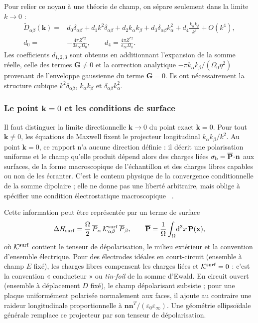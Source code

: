 Pour relier ce noyau à une théorie de champ, on sépare seulement dans la limite
$k\to0$ :
\begin{equation}
\begin{aligned}
\widetilde D_{\alpha\beta}(\mathbf k)
={}&d_0\delta_{\alpha\beta}
+d_1k^2\delta_{\alpha\beta}
+d_2k_\alpha k_\beta
+d_3\delta_{\alpha\beta}k_\alpha^2
+d_4\frac{k_\alpha k_\beta}{k^2}+O(k^4),\\
d_0={}&-\frac{4\pi Z^{*2}}{3\varepsilon_\infty\Omega_0},
\qquad
d_4=\frac{4\pi Z^{*2}}{\varepsilon_\infty\Omega_0}.
\end{aligned}
\label{eq:core_dipole_small_k}
\end{equation}
Les coefficients $d_{1,2,3}$ sont obtenus en additionnant l'expansion de la
somme réelle, celle des termes $\mathbf G\ne0$ et la correction analytique
$-\pi k_\alpha k_\beta/(\Omega_0\eta^2)$ provenant de l'enveloppe gaussienne
du terme $\mathbf G=0$. Ils ont nécessairement la structure cubique
$k^2\delta_{\alpha\beta}$, $k_\alpha k_\beta$ et
$\delta_{\alpha\beta}k_\alpha^2$.

\subsubsection{Le point \texorpdfstring{$\mathbf k=0$}{k=0} et les conditions de surface}

Il faut distinguer la limite directionnelle $\mathbf k\to0$ du point exact
$\mathbf k=0$. Pour tout $\mathbf k\neq0$, les équations de Maxwell fixent le
projecteur longitudinal $k_\alpha k_\beta/k^2$. Au point $\mathbf k=0$, ce
rapport n'a aucune direction définie : il décrit une polarisation uniforme et
le champ qu'elle produit dépend alors des charges liées
$\sigma_{\rm b}=\overline{\mathbf P}\!\cdot\!\mathbf n$ aux surfaces, de la
forme macroscopique de l'échantillon et des charges libres capables ou non de
les écranter. C'est le contenu physique de la convergence conditionnelle de la
somme dipolaire ; elle ne donne pas une liberté arbitraire, mais oblige à
spécifier une condition électrostatique macroscopique
~\cite{campbell1963existence,BornHuang1954}.

Cette information peut être représentée par un terme de surface
\begin{equation}
\Delta H_{\rm surf}
=\frac{\Omega}{2}\,
\overline P_\alpha\,
\mathcal K^{\rm surf}_{\alpha\beta}\,
\overline P_\beta,
\qquad
\overline{\mathbf P}=\frac1\Omega\int_\Omega\!\mathrm d^3x\,
\mathbf P(\mathbf x),
\label{eq:core_dipole_surface_term}
\end{equation}
où $\mathcal K^{\rm surf}$ contient le tenseur de dépolarisation, le milieu
extérieur et la convention d'ensemble électrique. Pour des électrodes idéales
en court-circuit (ensemble à champ $E$ fixé), les charges libres compensent
les charges liées et $\mathcal K^{\rm surf}=0$ : c'est la convention
« conducteur » ou \emph{tin-foil} de la somme d'Ewald. En circuit ouvert
(ensemble à déplacement $D$ fixé), le champ dépolarisant subsiste ; pour une
plaque uniformément polarisée normalement aux faces, il ajoute au contraire
une raideur longitudinale proportionnelle à
$\mathbf n\mathbf n^T/(\varepsilon_0\varepsilon_\infty)$. Une géométrie
ellipsoïdale générale remplace ce projecteur par son tenseur de
dépolarisation.

